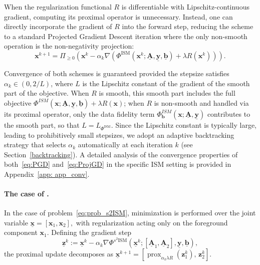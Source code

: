 \documentclass[letterpaper]{article}
\newcommand{\x}{\mathbf{x}}
\begin{document}
When the regularization functional $R$ is differentiable with Lipschitz-continuous gradient, computing its proximal operator is unnecessary. Instead, one can directly incorporate the 
gradient of $R$ into the forward step, reducing the scheme to a standard Projected Gradient 
Descent iteration where the only non-smooth operation is the non-negativity projection:
\begin{equation}
\label{eq:ProjGD}
\tag{ProjGD}
    \x^{k+1} = \Pi_{\geq 0}\left(\x^k - \alpha_k \nabla \left( 
    \Phi^{\text{ISM}} (\x^k; \underline{\mathbf{A}},\underline{\mathbf{y}}, \underline{\mathbf{b}}) 
    + \lambda R (\x^k)\right)\right).
\end{equation}

Convergence of both schemes is guaranteed provided the stepsize satisfies $\alpha_k\in(0,2/L)$, where $L$ is the Lipschitz constant of the gradient of the smooth part of the objective. When $R$ is smooth, this smooth part includes the full objective $\Phi^{ISM}(\x; \underline{\mathbf{A}}, \underline{\mathbf{y}},{\underline{\mathbf{b}}}) + \lambda R(\x)$; when $R$ is non-smooth and handled via its proximal operator, only the data fidelity term $\Phi_{\mathbf{b}}^{ISM}(\x; \underline{\mathbf{A}}, \underline{\mathbf{y}})$ contributes to the smooth part, so that $L=L_{\Phi^{\text{ISM}}}$. Since the Lipschitz constant is typically large, leading to prohibitively small stepsizes, we adopt an adaptive backtracking strategy that selects $\alpha_k$ automatically at each iteration $k$ (see Section~\ref{backtracking}). A detailed analysis of the convergence properties of both~\eqref{eq:PGD} and~\eqref{eq:ProjGD} in the specific ISM setting is provided in Appendix~\ref{app: app_conv}.

\paragraph{The case of .}
In the case of problem~\eqref{eq:prob_s2ISM}, minimization is performed over the joint variable
$
\underline{\x}
=
[\x_1,\x_2],
$
with regularization acting only on the foreground component $\x_1$. Defining the gradient step
\[
\underline{\mathbf z}^k
:=
\underline{\x}^k
-
\alpha_k
\nabla
\Phi^{s^2\text{ISM}}
(
\underline{\x}^k;
[\underline{\mathbf A}_1,\underline{\mathbf A}_2],
\underline{\mathbf y},
\underline{\mathbf b}
),
\]
the proximal update decomposes as
$
\underline{\x}^{k+1}
=
\left[
\operatorname{prox}_{\alpha_k\lambda R}(\mathbf z_1^k),
\,
\mathbf z_2^k
\right].
$
\end{document}

